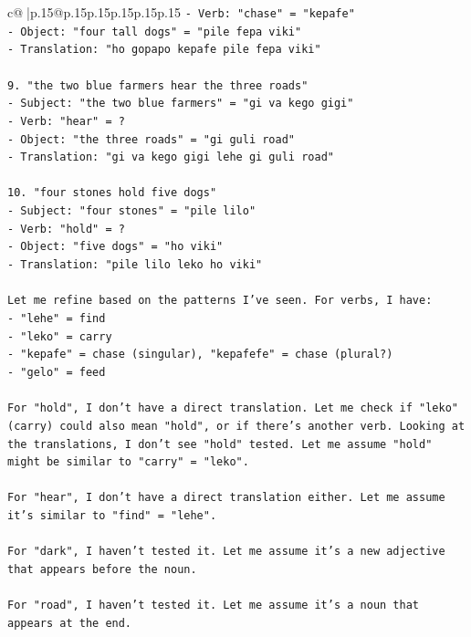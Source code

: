 \documentclass{article}
\begin{document}
{\begin{supertabular}{c@{$\;$}|p{.15\linewidth}@{}p{.15\linewidth}p{.15\linewidth}p{.15\linewidth}p{.15\linewidth}p{.15\linewidth}}
{{{\texttt{{-} Verb: "chase" = "kepafe"} \\
\texttt{{-} Object: "four tall dogs" = "pile fepa viki"} \\
\texttt{{-} Translation: "ho gopapo kepafe pile fepa viki"} \\
\\ 
\texttt{9. "the two blue farmers hear the three roads"} \\
\texttt{{-} Subject: "the two blue farmers" = "gi va kego gigi"} \\
\texttt{{-} Verb: "hear" = ?} \\
\texttt{{-} Object: "the three roads" = "gi guli road"} \\
\texttt{{-} Translation: "gi va kego gigi lehe gi guli road"} \\
\\ 
\texttt{10. "four stones hold five dogs"} \\
\texttt{{-} Subject: "four stones" = "pile lilo"} \\
\texttt{{-} Verb: "hold" = ?} \\
\texttt{{-} Object: "five dogs" = "ho viki"} \\
\texttt{{-} Translation: "pile lilo leko ho viki"} \\
\\ 
\texttt{Let me refine based on the patterns I've seen. For verbs, I have:} \\
\texttt{{-} "lehe" = find} \\
\texttt{{-} "leko" = carry} \\
\texttt{{-} "kepafe" = chase (singular), "kepafefe" = chase (plural?)} \\
\texttt{{-} "gelo" = feed} \\
\\ 
\texttt{For "hold", I don't have a direct translation. Let me check if "leko" (carry) could also mean "hold", or if there's another verb. Looking at the translations, I don't see "hold" tested. Let me assume "hold" might be similar to "carry" = "leko".} \\
\\ 
\texttt{For "hear", I don't have a direct translation either. Let me assume it's similar to "find" = "lehe".} \\
\\ 
\texttt{For "dark", I haven't tested it. Let me assume it's a new adjective that appears before the noun.} \\
\\ 
\texttt{For "road", I haven't tested it. Let me assume it's a noun that appears at the end.} \\
}}}
\end{supertabular}}
\end{document}
